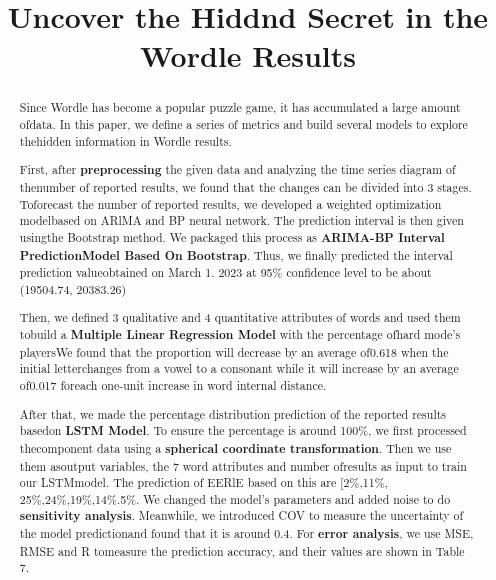 \documentclass[12pt]{ctexart}
\title{Uncover the Hiddnd Secret in the Wordle Results}  %
\begin{document}
\setlength{\parindent}{0pt}

\begin{abstract}

	Since Wordle has become a popular puzzle game, it has accumulated a large amount ofdata. In this paper, we define a series of metrics and build several models to explore thehidden information in Wordle results.

	First, after \textbf{preprocessing} the given data and analyzing the time series diagram of thenumber of reported results, we found that the changes can be divided into 3 stages. Toforecast the number of reported results, we developed a weighted optimization modelbased on ARlMA and BP neural network. The prediction interval is then given usingthe Bootstrap method. We packaged this process as \textbf{ARIMA-BP Interval PredictionModel Based On Bootstrap}. Thus, we finally predicted the interval prediction valueobtained on March 1. 2023 at 95\% confidence level to be about (19504.74, 20383.26)

	Then, we defined 3 qualitative and 4 quantitative attributes of words and used them tobuild a \textbf{Multiple Linear Regression Model} with the percentage ofhard mode's playersWe found that the proportion will decrease by an average of0.618 when the initial letterchanges from a vowel to a consonant while it will increase by an average of0.017 foreach one-unit increase in word internal distance.

	After that, we made the percentage distribution prediction of the reported results basedon \textbf{LSTM Model}. To ensure the percentage is around 100\%, we first processed thecomponent data using a \textbf{spherical coordinate transformation}. Then we use them asoutput variables, the 7 word attributes and number ofresults as input to train our LSTMmodel. The prediction of EERlE based on this are [2\%,11\%, 25\%,24\%,19\%,14\%.5\%. We changed the model's parameters and added noise to do \textbf{sensitivity analysis}. Meanwhile, we introduced COV to measure the uncertainty of the model predictionand found that it is around 0.4. For \textbf{error analysis}, we use MSE, RMSE and R tomeasure the prediction accuracy, and their values are shown in Table 7.
	

\end{abstract}
\end{document}
